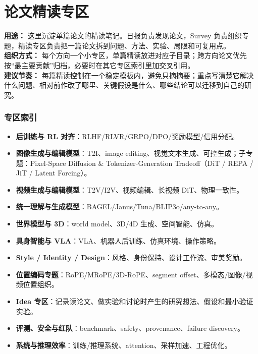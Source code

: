 
\part*{论文精读专区}
{}

\begin{conceptbox}
\textbf{用途：} 这里沉淀单篇论文的精读笔记。日报负责发现论文，Survey 负责组织专题，精读专区负责把一篇论文拆到问题、方法、实验、局限和可复用点。\\
\textbf{组织方式：} 每个方向一个小专区，单篇精读放进对应子目录；跨方向论文优先按“最主要贡献”归档，必要时在其它专区索引里加交叉引用。\\
\textbf{建议节奏：} 每篇精读控制在一个稳定模板内，避免只摘摘要；重点写清楚它解决什么问题、相对前作改了哪里、关键假设是什么、哪些结论可以迁移到自己的研究。
\end{conceptbox}

\section*{专区索引}
{}

\begin{itemize}[leftmargin=1.5em]
  \item \textbf{后训练与 RL 对齐}：RLHF/RLVR/GRPO/DPO/奖励模型/信用分配。
  \item \textbf{图像生成与编辑模型}：T2I、image editing、视觉文本生成、可控生成；子专题：Pixel-Space Diffusion \& Tokenizer-Generation Tradeoff（DiT / REPA / JiT / Latent Forcing）。
  \item \textbf{视频生成与编辑模型}：T2V/I2V、视频编辑、长视频 DiT、物理一致性。
  \item \textbf{统一理解与生成模型}：BAGEL/Janus/Tuna/BLIP3o/any-to-any。
  \item \textbf{世界模型与 3D}：world model、3D/4D 生成、空间智能、仿真。
  \item \textbf{具身智能与 VLA}：VLA、机器人后训练、仿真环境、操作策略。
  \item \textbf{Style / Identity / Design}：风格、身份保持、设计工作流、审美奖励。
  \item \textbf{位置编码专题}：RoPE/MRoPE/3D-RoPE、segment offset、多模态/图像/视频位置组织。
  \item \textbf{Idea 专区}：记录读论文、做实验和讨论时产生的研究想法、假设和最小验证实验。
  \item \textbf{评测、安全与红队}：benchmark、safety、provenance、failure discovery。
  \item \textbf{系统与推理效率}：训练/推理系统、attention、采样加速、工程优化。
\end{itemize}

